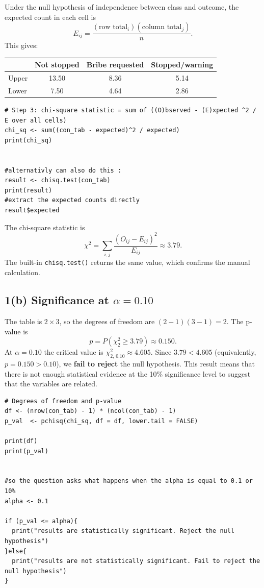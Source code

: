 \documentclass[11pt]{article}
\begin{document}
Under the null hypothesis of independence between class and outcome, the expected count in each cell is
\[
E_{ij} = \frac{(\text{row total}_i)(\text{column total}_j)}{n}.
\]
This gives:

\begin{center}
\begin{tabular}{lccc}
\toprule
 & Not stopped & Bribe requested & Stopped/warning \\
\midrule
Upper & 13.50 & 8.36 & 5.14 \\
Lower & 7.50 & 4.64 & 2.86 \\
\bottomrule
\end{tabular}
\end{center}

\begin{lstlisting}
# Step 3: chi-square statistic = sum of ((O)bserved - (E)xpected ^2 / E over all cells)
chi_sq <- sum((con_tab - expected)^2 / expected)
print(chi_sq)


#alternativly can also do this : 
result <- chisq.test(con_tab)
print(result)
#extract the expected counts directly
result$expected
\end{lstlisting}

The chi-square statistic is
\[
\chi^2 = \sum_{i,j} \frac{(O_{ij} - E_{ij})^2}{E_{ij}} \approx 3.79.
\]
The built-in \texttt{chisq.test()} returns the same value, which confirms the manual calculation.


\subsection*{1(b) Significance at $\alpha = 0.10$}

The table is $2 \times 3$, so the degrees of freedom are $(2-1)(3-1) = 2$. The p-value is
\[
p = P(\chi^2_2 \geq 3.79) \approx 0.150.
\]
At $\alpha = 0.10$ the critical value is $\chi^2_{2,\,0.10} \approx 4.605$. Since $3.79 < 4.605$ (equivalently, $p = 0.150 > 0.10$), we \textbf{fail to reject} the null hypothesis. This result means that there is not enough statistical evidence at the 10\% significance level to suggest that the variables are related.

\begin{lstlisting}
# Degrees of freedom and p-value
df <- (nrow(con_tab) - 1) * (ncol(con_tab) - 1)
p_val  <- pchisq(chi_sq, df = df, lower.tail = FALSE)

print(df)
print(p_val)


#so the question asks what happens when the alpha is equal to 0.1 or 10%
alpha <- 0.1

if (p_val <= alpha){
  print("results are statistically significant. Reject the null hypothesis")
}else{
  print("results are not statistically significant. Fail to reject the null hypothesis")
}

\end{lstlisting}
\end{document}
